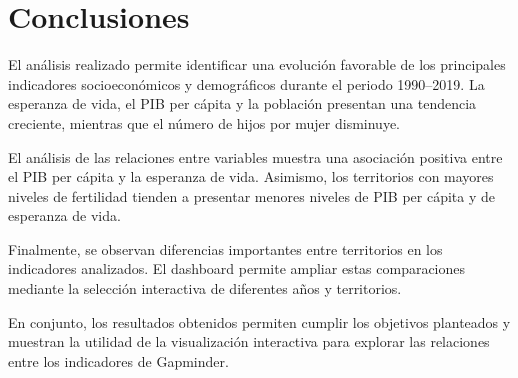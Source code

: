 \documentclass{article}
\begin{document}
\section{Conclusiones}

El análisis realizado permite identificar una evolución favorable de los
principales indicadores socioeconómicos y demográficos durante el periodo
1990--2019. La esperanza de vida, el PIB per cápita y la población
presentan una tendencia creciente, mientras que el número de hijos por
mujer disminuye.

El análisis de las relaciones entre variables muestra una asociación
positiva entre el PIB per cápita y la esperanza de vida. Asimismo, los
territorios con mayores niveles de fertilidad tienden a presentar menores
niveles de PIB per cápita y de esperanza de vida.

Finalmente, se observan diferencias importantes entre territorios en
los indicadores analizados. El dashboard permite ampliar estas
comparaciones mediante la selección interactiva de diferentes años y
territorios.

En conjunto, los resultados obtenidos permiten cumplir los objetivos
planteados y muestran la utilidad de la visualización interactiva para
explorar las relaciones entre los indicadores de Gapminder.
\end{document}
